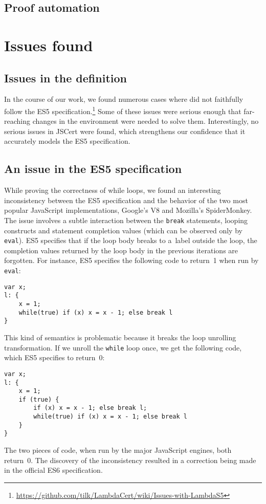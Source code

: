 \documentclass{llncs}
\newcommand{\jsinline}[1]{\texttt{#1}}
\begin{document}
\subsection{Proof automation}

\section{Issues found}
\label{sec:issues}

\subsection{Issues in the \lambdajs definition}

In the course of our work, we found numerous cases where
\lambdajs did not faithfully follow the ES5 
specification.\footnote{\url{https://github.com/tilk/LambdaCert/wiki/Issues-with-LambdaS5}}
Some of these issues were serious enough that
far-reaching changes in the \lambdajs environment were needed
to solve them. Interestingly, no serious issues in JSCert were
found, which strengthens our confidence that it accurately models
the ES5 specification.

\subsection{An issue in the ES5 specification}

While proving the correctness of while loops, we found an interesting
inconsistency between the ES5 specification and the behavior
of the two most popular JavaScript implementations, Google's V8 and
Mozilla's SpiderMonkey. The issue involves a subtle interaction
between the \jsinline{break} statements, looping constructs
and statement completion values (which can be observed only by \jsinline{eval}).
ES5 specifies that if the loop body breaks to a~label outside the loop,
the completion values returned by the loop body in the previous iterations
are forgotten. For instance, ES5 specifies the following code to return~1 when run by \jsinline{eval}:
\begin{verbatim}
var x; 
l: { 
    x = 1; 
    while(true) if (x) x = x - 1; else break l 
}
\end{verbatim}
This kind of semantics is problematic because it breaks the loop unrolling
transformation. If we unroll the \jsinline{while} loop once, we get the
following code, which ES5 specifies to return~0:
\begin{verbatim}
var x; 
l: { 
    x = 1; 
    if (true) { 
        if (x) x = x - 1; else break l; 
        while(true) if (x) x = x - 1; else break l 
    }
}
\end{verbatim}
The two pieces of code, when run by the major JavaScript engines, both return~0.
The discovery of the inconsistency
resulted in a correction being made in the official ES6
specification\cite{esdiscuss:loop-unrolling}.
\end{document}
